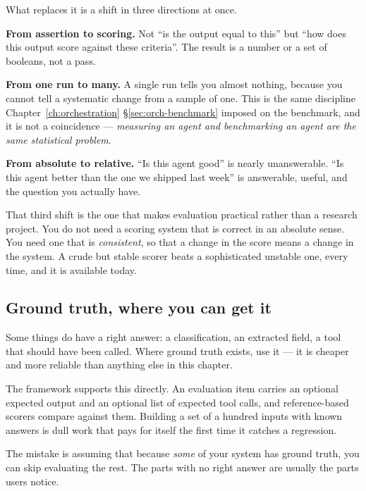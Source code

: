 What replaces it is a shift in three directions at once.

\textbf{From assertion to scoring.} Not ``is the output equal to this'' but ``how
does this output score against these criteria''. The result is a number or a set
of booleans, not a pass.

\textbf{From one run to many.} A single run tells you almost nothing, because you
cannot tell a systematic change from a sample of one. This is the same discipline
Chapter~\ref{ch:orchestration} \S\ref{sec:orch-benchmark} imposed on the
benchmark, and it is not a coincidence --- \emph{measuring an agent and
benchmarking an agent are the same statistical problem}.

\textbf{From absolute to relative.} ``Is this agent good'' is nearly unanswerable.
``Is this agent better than the one we shipped last week'' is answerable, useful,
and the question you actually have.

\begin{note}
That third shift is the one that makes evaluation practical rather than a
research project. You do not need a scoring system that is correct in an absolute
sense. You need one that is \emph{consistent}, so that a change in the score
means a change in the system. A crude but stable scorer beats a sophisticated
unstable one, every time, and it is available today.
\end{note}

\subsection{Ground truth, where you can get it}

Some things do have a right answer: a classification, an extracted field, a tool
that should have been called. Where ground truth exists, use it --- it is cheaper
and more reliable than anything else in this chapter.

The framework supports this directly. An evaluation item carries an optional
expected output and an optional list of expected tool calls, and reference-based
scorers compare against them. Building a set of a hundred inputs with known
answers is dull work that pays for itself the first time it catches a regression.

The mistake is assuming that because \emph{some} of your system has ground truth,
you can skip evaluating the rest. The parts with no right answer are usually the
parts users notice.

